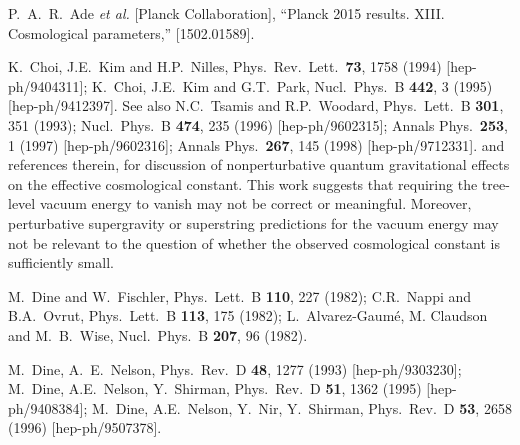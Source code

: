 \documentclass[11pt]{article}
\begin{document}
\begin{thebibliography}{999}
P.~A.~R.~Ade {\it et al.} [Planck Collaboration],
  ``Planck 2015 results. XIII. Cosmological parameters,''
  [1502.01589].
 
K.~Choi, J.E.~Kim and H.P.~Nilles, 
  Phys.\ Rev.\ Lett.\  {\bf 73}, 1758 (1994)
  [hep-ph/9404311];
K.~Choi, J.E.~Kim and G.T.~Park, 
  Nucl.\ Phys.\ B {\bf 442}, 3 (1995)
  [hep-ph/9412397].
See also
N.C.~Tsamis and R.P.~Woodard, 
  Phys.\ Lett.\ B {\bf 301}, 351 (1993);
  Nucl.\ Phys.\ B {\bf 474}, 235 (1996)
  [hep-ph/9602315];
  Annals Phys.\  {\bf 253}, 1 (1997)
  [hep-ph/9602316];
  Annals Phys.\  {\bf 267}, 145 (1998)
  [hep-ph/9712331].
and references therein, for discussion of nonperturbative quantum 
gravitational effects on the effective cosmological constant. This work 
suggests that requiring the tree-level vacuum energy to vanish may not be 
correct or meaningful. Moreover, perturbative supergravity or superstring 
predictions for the vacuum energy may not be relevant to the question of 
whether the observed cosmological constant is sufficiently small.

M.~Dine and W.~Fischler,
  Phys.\ Lett.\ B {\bf 110}, 227 (1982);
C.R.~Nappi and B.A.~Ovrut,
  Phys.\ Lett.\ B {\bf 113}, 175 (1982);
L.~Alvarez-Gaum\'e, M. Claudson and M.~B.~Wise, 
  Nucl.\ Phys.\ B {\bf 207}, 96 (1982).

M.~Dine, A.~E.~Nelson,
  Phys.\ Rev.\ D {\bf 48}, 1277 (1993)
  [hep-ph/9303230];
M.~Dine, A.E.~Nelson, Y.~Shirman, 
  Phys.\ Rev.\ D {\bf 51}, 1362 (1995)
  [hep-ph/9408384];
M.~Dine, A.E.~Nelson, Y.~Nir, Y.~Shirman, 
  Phys.\ Rev.\ D {\bf 53}, 2658 (1996)
  [hep-ph/9507378].


\end{thebibliography}
\end{document}
